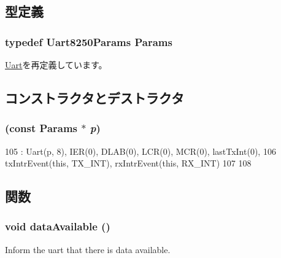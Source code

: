\subsection{型定義}
\hypertarget{classUart8250_aa413e69885bd7a520ee8b988aa3e1c8b}{
\subsubsection[{Params}]{\setlength{\rightskip}{0pt plus 5cm}typedef Uart8250Params {\bf Params}}}
\label{classUart8250_aa413e69885bd7a520ee8b988aa3e1c8b}


\hyperlink{classUart_a20a580db9778bd0604704c3c6baabfa6}{Uart}を再定義しています。

\subsection{コンストラクタとデストラクタ}
\hypertarget{classUart8250_a199a0b3907670a9f201d8123ce9bbcda}{
\subsubsection[{Uart8250}]{ (const {\bf Params} $\ast$ {\em p})}}
\label{classUart8250_a199a0b3907670a9f201d8123ce9bbcda}



\begin{DoxyCode}
105     : Uart(p, 8), IER(0), DLAB(0), LCR(0), MCR(0), lastTxInt(0),
106       txIntrEvent(this, TX_INT), rxIntrEvent(this, RX_INT)
107 {
108 }
\end{DoxyCode}


\subsection{関数}
\hypertarget{classUart8250_a603e184f4f31471b76cff54303262aa8}{
\subsubsection[{dataAvailable}]{\setlength{\rightskip}{0pt plus 5cm}void dataAvailable ()}}
\label{classUart8250_a603e184f4f31471b76cff54303262aa8}
Inform the uart that there is data available. 

